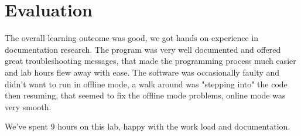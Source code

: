 \newpage
\section{Evaluation}
The overall learning outcome was good, we got hands on experience in documentation research.
The program was very well documented and offered great troubleshooting messages, that made the programming process much easier and lab hours flew away with ease. The software was occasionally faulty and didn't want to run in offline mode, a walk around was "stepping into" the code then resuming, that seemed to fix the offline mode problems, online mode was very smooth.

We've spent 9 hours on this lab, happy with the work load and documentation. 